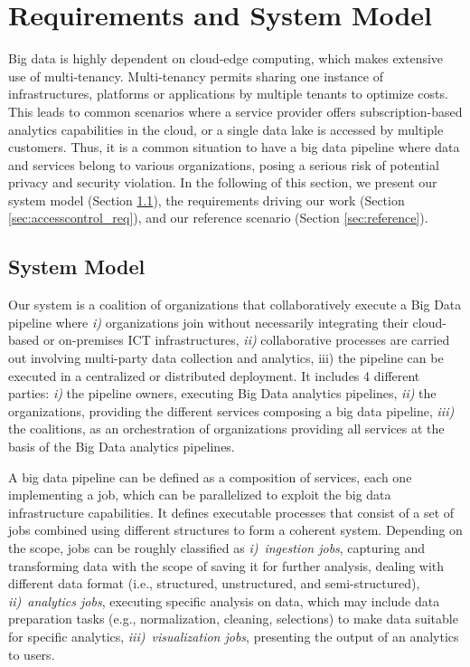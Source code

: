 \section{Requirements and System Model}\label{sec:requirements}
Big data is highly dependent on cloud-edge computing, which makes extensive use of mul\-ti-te\-nan\-cy. Mul\-ti-te\-nan\-cy permits sharing one instance of infrastructures, platforms or applications by multiple tenants to optimize costs. This leads to common scenarios where a service provider offers subscription-based analytics capabilities in the cloud, or a single data lake is accessed by multiple customers. Thus, it is a common situation to have a big data pipeline where data and services belong to various organizations, posing a serious risk of potential privacy and security violation. In the following of this section, we present our system model (Section \ref{sec:systemmodel}), the requirements driving our work (Section \ref{sec:accesscontrol_req}), and our reference scenario (Section \ref{sec:reference}).

\subsection{System Model}\label{sec:systemmodel}
Our system is a coalition of organizations that collaboratively execute a Big Data pipeline where \emph{i)} organizations join without necessarily integrating their cloud-based or on-premises ICT infrastructures, \emph{ii)} collaborative processes are carried out involving multi-party data collection and analytics, iii) the pipeline can be executed in a centralized or distributed deployment. 
It includes 4 different parties: \emph{i)} the pipeline owners, executing Big Data analytics pipelines, \emph{ii)} the organizations, providing the different services composing a big data pipeline, \emph{iii)} the coalitions, as an orchestration of organizations providing all services at the basis of the Big Data analytics pipelines. 

A big data pipeline can be defined as a composition of services, each one implementing a job, which can be parallelized to exploit the big data infrastructure capabilities. It defines executable processes that consist of a set of jobs combined using different structures to form a coherent system. Depending on the scope, jobs can be roughly classified as {\em i)}~\emph{ingestion jobs}, capturing and transforming data with the scope of saving it for further analysis, dealing with different data format (i.e., structured, unstructured, and semi-structured), {\em ii)}~\emph{analytics jobs}, executing specific analysis on data, which may include data preparation tasks (e.g., normalization, cleaning, selections) to make data suitable for specific analytics, {\em iii)~visualization jobs}, presenting the output of an analytics to users. 


